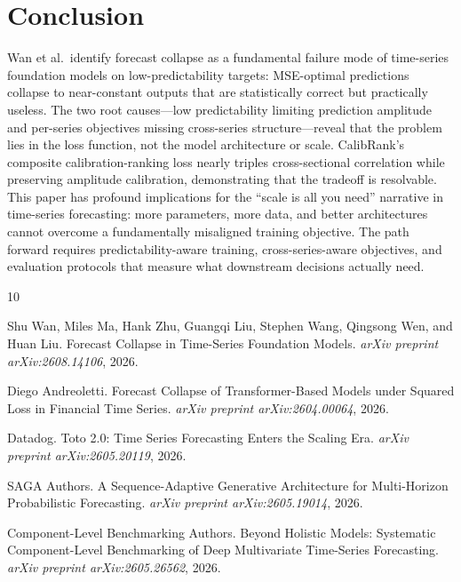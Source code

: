 \documentclass[11pt,a4paper]{article}
\begin{document}
\section{Conclusion}

Wan et al.\ identify forecast collapse as a fundamental failure mode of time-series foundation models on low-predictability targets: MSE-optimal predictions collapse to near-constant outputs that are statistically correct but practically useless. The two root causes---low predictability limiting prediction amplitude and per-series objectives missing cross-series structure---reveal that the problem lies in the loss function, not the model architecture or scale. CalibRank's composite calibration-ranking loss nearly triples cross-sectional correlation while preserving amplitude calibration, demonstrating that the tradeoff is resolvable. This paper has profound implications for the ``scale is all you need'' narrative in time-series forecasting: more parameters, more data, and better architectures cannot overcome a fundamentally misaligned training objective. The path forward requires predictability-aware training, cross-series-aware objectives, and evaluation protocols that measure what downstream decisions actually need.


\begin{thebibliography}{10}

Shu Wan, Miles Ma, Hank Zhu, Guangqi Liu, Stephen Wang, Qingsong Wen, and Huan Liu.
\newblock Forecast Collapse in Time-Series Foundation Models.
\newblock \emph{arXiv preprint arXiv:2608.14106}, 2026.

Diego Andreoletti.
\newblock Forecast Collapse of Transformer-Based Models under Squared Loss in Financial Time Series.
\newblock \emph{arXiv preprint arXiv:2604.00064}, 2026.

Datadog.
\newblock Toto 2.0: Time Series Forecasting Enters the Scaling Era.
\newblock \emph{arXiv preprint arXiv:2605.20119}, 2026.

{SAGA} Authors.
\newblock A Sequence-Adaptive Generative Architecture for Multi-Horizon Probabilistic Forecasting.
\newblock \emph{arXiv preprint arXiv:2605.19014}, 2026.

Component-Level Benchmarking Authors.
\newblock Beyond Holistic Models: Systematic Component-Level Benchmarking of Deep Multivariate Time-Series Forecasting.
\newblock \emph{arXiv preprint arXiv:2605.26562}, 2026.

\end{thebibliography}
\end{document}
